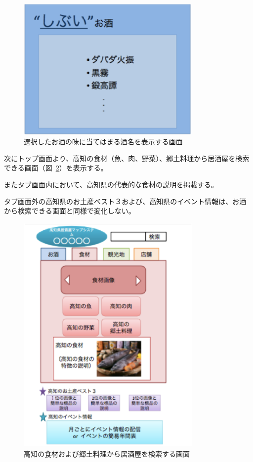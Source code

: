 \documentclass[a4j,titlepage]{jarticle}
\begin{document}
\begin {figure}[!htbp]
    \begin{center}
    \includegraphics [height=7cm, width=9cm]{7.eps}
    \caption {選択したお酒の味に当てはまる酒名を表示する画面}
    \label {fig:7}
    \end{center}
\end {figure}



次にトップ画面より、高知の食材（魚、肉、野菜）、郷土料理から居酒屋を検索できる画面（図~\ref{fig:8}）を表示する。



またタブ画面内において、高知県の代表的な食材の説明を掲載する。



タブ画面外の高知県のお土産ベスト３および、高知県のイベント情報は、お酒から検索できる画面と同様で変化しない。
\clearpage
\begin {figure}[!htbp]
    \begin{center}
    \includegraphics [height=12cm, width=9cm]{8.eps}
    \caption {高知の食材および郷土料理から居酒屋を検索する画面}
    \label {fig:8}
    \end{center}
\end {figure}
\end{document}
